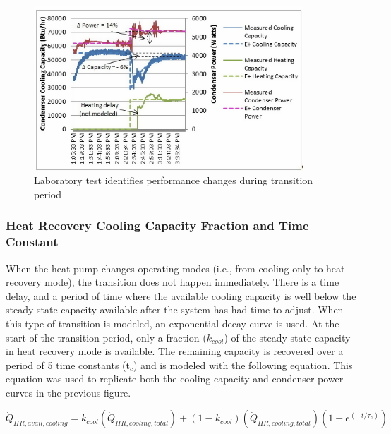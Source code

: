 \begin{figure}[hbtp] %
\centering
\includegraphics[width=0.9\textwidth, height=0.9\textheight, keepaspectratio=true]{media/image5367.png}
\caption{Laboratory test identifies performance changes during transition period \label{fig:laboratory-test-identifies-performance-changes-during-transition-period}}
\end{figure}

\subsubsection{Heat Recovery Cooling Capacity Fraction and Time Constant}\label{heat-recovery-cooling-capacity-fraction-and-time-constant}

When the heat pump changes operating modes (i.e., from cooling only to heat recovery mode), the transition does not happen immediately. There is a time delay, and a period of time where the available cooling capacity is well below the steady-state capacity available after the system has had time to adjust. When this type of transition is modeled, an exponential decay curve is used. At the start of the transition period, only a fraction (\(k_{cool}\)) of the steady-state capacity in heat recovery mode is available. The remaining capacity is recovered over a period of 5 time constants (t\(_{c}\)) and is modeled with the following equation. This equation was used to replicate both the cooling capacity and condenser power curves in the previous figure.

\begin{equation}
  \dot{Q}_{HR,avail,cooling} = k_{cool} \left( \dot{Q}_{HR,cooling,total} \right) + \left( 1 - k_{cool} \right) \left( \dot{Q}_{HR,cooling,total} \right) \left( 1 - e^{\left( -t / \tau_c \right)}  \right)
\end{equation}

